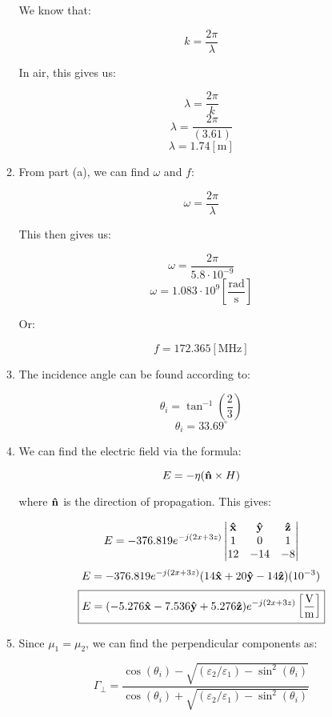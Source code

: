 \begin{enumerate}
\begin{enumerate}
        We know that:

        $$k=\frac{2\pi}{\lambda}$$

        In air, this gives us:

        $$\lambda=\frac{2\pi}{k}$$
        $$\lambda=\frac{2\pi}{(3.61)}$$
        $$\boxed{\lambda=1.74[\si{\meter}]}$$

      \item 

        From part (a), we can find $\omega$ and $f$:

        $$\omega=\frac{2\pi}{\lambda}$$

        This then gives us:

        $$\omega=\frac{2\pi}{5.8\cdot10^{-9}}$$
        $$\boxed{\omega=1.083\cdot10^9\left[ \frac{\text{rad}}{\si{\second}} \right]}$$

        Or:

        $$\boxed{f=172.365\left[ \si{\mega\hertz} \right]}$$


      \item 

        The incidence angle can be found according to:

        $$\theta_i=\tan^{-1}\left( \frac{2}{3} \right)$$
        $$\boxed{\theta_i=33.69^{\circ}}$$

      \item 

        We can find the electric field via the formula:

        $$E=-\eta(\bold{\hat{n}}\times H)$$

        where $\bold{\hat{n}}$ is the direction of propagation. This gives:

        $$E=-376.819e^{-j(2x+3z)}\left|\begin{matrix}\bold{\hat{x}} & \bold{\hat{y}} & \bold{\hat{z}}\\ 1 & 0 & 1\\ 12 & -14 & -8 \end{matrix}\right|$$
        $$E=-376.819e^{-j(2x+3z)}(14\bold{\hat{x}}+20\bold{\hat{y}}-14\bold{\hat{z}})(10^{-3})$$
        $$\boxed{E=(-5.276\bold{\hat{x}}-7.536\bold{\hat{y}}+5.276\bold{\hat{z}})e^{-j(2x+3z)}\left[ \frac{\si{\volt}}{\si{\meter}} \right]}$$

      \item 

        Since $\mu_1=\mu_2$, we can find the perpendicular components as:

        $$\Gamma_{\perp}=\frac{\cos(\theta_i)-\sqrt{(\varepsilon_2/\varepsilon_1)-\sin^2(\theta_i)}}{\cos(\theta_i)+\sqrt{(\varepsilon_2/\varepsilon_1)-\sin^2(\theta_i)}}$$


\end{enumerate}
\end{enumerate}
